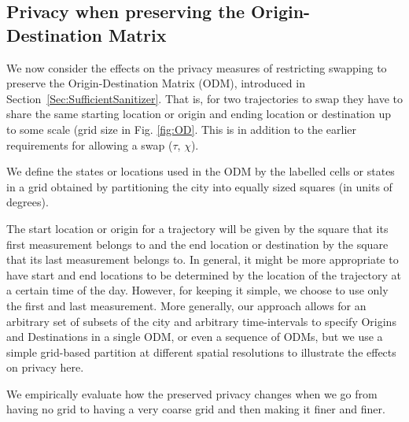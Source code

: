 \documentclass[times,twocolumn,final,authoryear]{elsarticle}
\begin{document}
\subsection{Privacy when preserving the Origin-Destination Matrix}\label{S:PrivacyODM}
We now consider the effects on the privacy measures of restricting 
swapping to preserve the Origin-Destination Matrix (ODM), introduced in Section~\ref{Sec:SufficientSanitizer}. That is, for two trajectories to
swap they have to share the same starting location or origin and ending location or destination up to some scale (grid size in Fig. \ref{fig:OD}.  
This is in addition to the earlier requirements for allowing a swap ($\tau$, $\chi$).

We define the states or locations used in the ODM by the labelled cells or states in a grid obtained by partitioning the
city into equally sized squares (in units of degrees).  

The start location or origin for a trajectory will be given by the square that its first
measurement belongs to and the end location or destination by the square that its last
measurement belongs to. 
In general, it might be more appropriate to
have start and end locations to be determined by the location of the
trajectory at a certain time of the day. 
However, for keeping it
simple, we choose to use only the first and last measurement.
More generally, our approach allows for an arbitrary set of subsets of the city and arbitrary time-intervals to specify Origins and Destinations in a single ODM, or even a sequence of ODMs, but we use a simple grid-based partition at different spatial resolutions to illustrate the effects on privacy here.  

We empirically evaluate how the preserved privacy changes when we go from having
no grid to having a very coarse grid and then making it finer and
finer.
\end{document}
